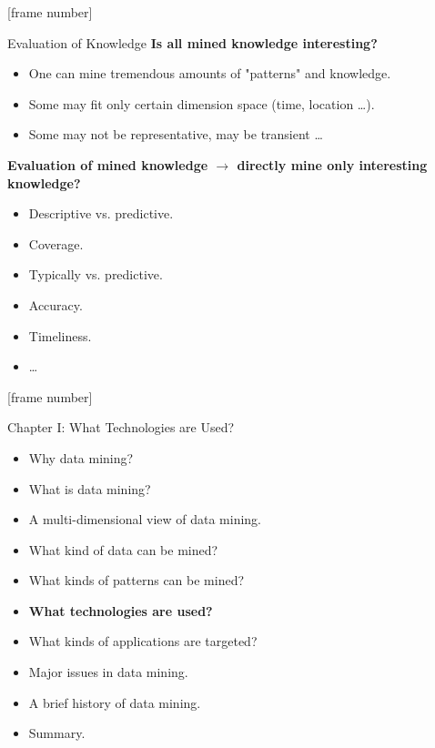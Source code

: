 \documentclass[aspectratio=169,t]{beamer}
\begin{document}
  {
    [frame number]
    \begin{frame}{Evaluation of Knowledge}
    \textbf{Is all mined knowledge interesting?}
    \begin{itemize}
        \item One can mine tremendous amounts of "patterns" and knowledge.
        \item Some may fit only certain dimension space (time, location \ldots).
        \item Some may not be representative, may be transient \ldots
    \end{itemize}

    \textbf{Evaluation of mined knowledge $\rightarrow$ directly mine only interesting knowledge?}
    \begin{itemize}
        \item Descriptive vs. predictive.
        \item Coverage.
        \item Typically vs. predictive.
        \item Accuracy.
        \item Timeliness.
        \item \ldots
    \end{itemize}
    \end{frame}
  }

  {
    [frame number]
    \begin{frame}{Chapter I: What Technologies are Used?}
        \begin{itemize}
            \item Why data mining?
            \item What is data mining?
            \item A multi-dimensional view of data mining.
            \item What kind of data can be mined?
            \item What kinds of patterns can be mined?
            \item \textbf{What technologies are used?}
            \item What kinds of applications are targeted?
            \item Major issues in data mining.
            \item A brief history of data mining.
            \item Summary.
        \end{itemize}
    \end{frame}
  }
\end{document}
